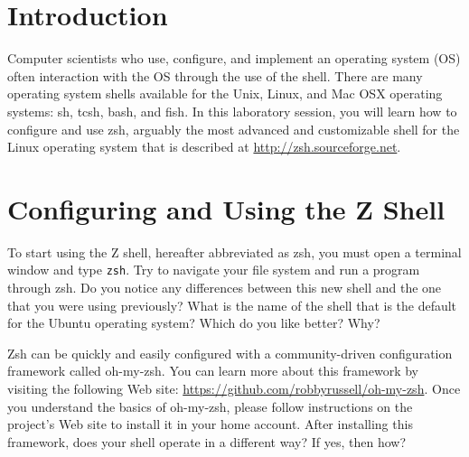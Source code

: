 

\usepackage[compact]{titlesec}



\section*{Introduction}


Computer scientists who use, configure, and implement an operating system (OS) often interaction with the OS through the use of
the shell.  There are many operating system shells available for the Unix, Linux, and Mac OSX operating systems: sh, tcsh, bash,
and fish.  In this laboratory session, you will learn how to configure and use zsh, arguably the most advanced and customizable
shell for the Linux operating system that is described at \url{http://zsh.sourceforge.net}.

\section*{Configuring and Using the Z Shell}

To start using the Z shell, hereafter abbreviated as zsh, you must open a terminal window and type {\tt zsh}.  Try to navigate
your file system and run a program through zsh.  Do you notice any differences between this new shell and the one that you were
using previously?  What is the name of the shell that is the default for the Ubuntu operating system? Which do you like better?
Why?

Zsh can be quickly and easily configured with a community-driven configuration framework called oh-my-zsh.  You can learn more
about this framework by visiting the following Web site: \url{https://github.com/robbyrussell/oh-my-zsh}. Once you understand the
basics of oh-my-zsh, please follow instructions on the project's Web site to install it in your home account. After installing
this framework, does your shell operate in a different way? If yes, then how?

